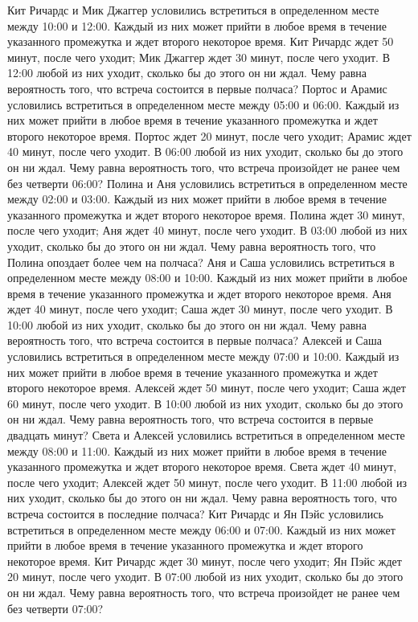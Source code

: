 Кит Ричардс и Мик Джаггер условились встретиться в определенном месте между 10:00 и 12:00. Каждый из них может прийти в любое время в течение указанного промежутка и ждет второго некоторое время. Кит Ричардс ждет 50 минут, после чего уходит; Мик Джаггер ждет 30 минут, после чего уходит. В 12:00 любой из них уходит, сколько бы до этого он ни ждал. Чему равна вероятность того, что встреча состоится в первые полчаса?
Портос и Арамис условились встретиться в определенном месте между 05:00 и 06:00. Каждый из них может прийти в любое время в течение указанного промежутка и ждет второго некоторое время. Портос ждет 20 минут, после чего уходит; Арамис ждет 40 минут, после чего уходит. В 06:00 любой из них уходит, сколько бы до этого он ни ждал. Чему равна вероятность того, что встреча произойдет не ранее чем без четверти 06:00?
Полина и Аня условились встретиться в определенном месте между 02:00 и 03:00. Каждый из них может прийти в любое время в течение указанного промежутка и ждет второго некоторое время. Полина ждет 30 минут, после чего уходит; Аня ждет 40 минут, после чего уходит. В 03:00 любой из них уходит, сколько бы до этого он ни ждал. Чему равна вероятность того, что Полина опоздает более чем на полчаса?
Аня и Саша условились встретиться в определенном месте между 08:00 и 10:00. Каждый из них может прийти в любое время в течение указанного промежутка и ждет второго некоторое время. Аня ждет 40 минут, после чего уходит; Саша ждет 30 минут, после чего уходит. В 10:00 любой из них уходит, сколько бы до этого он ни ждал. Чему равна вероятность того, что встреча состоится в первые полчаса?
Алексей и Саша условились встретиться в определенном месте между 07:00 и 10:00. Каждый из них может прийти в любое время в течение указанного промежутка и ждет второго некоторое время. Алексей ждет 50 минут, после чего уходит; Саша ждет 60 минут, после чего уходит. В 10:00 любой из них уходит, сколько бы до этого он ни ждал. Чему равна вероятность того, что встреча состоится в первые двадцать минут?
Света и Алексей условились встретиться в определенном месте между 08:00 и 11:00. Каждый из них может прийти в любое время в течение указанного промежутка и ждет второго некоторое время. Света ждет 40 минут, после чего уходит; Алексей ждет 50 минут, после чего уходит. В 11:00 любой из них уходит, сколько бы до этого он ни ждал. Чему равна вероятность того, что встреча состоится в последние полчаса?
Кит Ричардс и Ян Пэйс условились встретиться в определенном месте между 06:00 и 07:00. Каждый из них может прийти в любое время в течение указанного промежутка и ждет второго некоторое время. Кит Ричардс ждет 30 минут, после чего уходит; Ян Пэйс ждет 20 минут, после чего уходит. В 07:00 любой из них уходит, сколько бы до этого он ни ждал. Чему равна вероятность того, что встреча произойдет не ранее чем без четверти 07:00?
